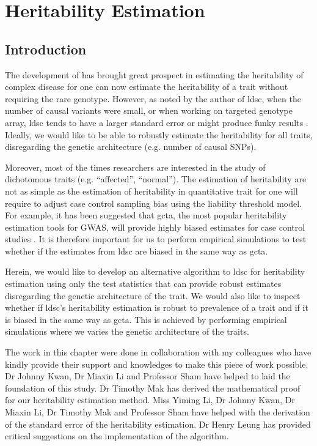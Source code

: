 \chapter{Heritability Estimation}

	\section{Introduction}
	The development of  has brought great prospect in estimating the heritability of complex disease for one can now estimate the heritability of a trait without requiring the rare genotype. 
	However, as noted by the author of \gls{ldsc}, when the number of causal variants were small, or when working on targeted genotype array, \gls{ldsc} tends to have a larger standard error or might produce funky results \citep{Bulik-Sullivan2015}.
	Ideally, we would like to be able to robustly estimate the heritability for all traits, disregarding the genetic architecture (e.g. number of causal \glspl{SNP}).
	
	Moreover, most of the times researchers are interested in the study of dichotomous traits (e.g. ``affected'', ``normal'').
	The estimation of heritability are not as simple as the estimation of heritability in quantitative trait for one will require to adjust case control sampling bias using the liability threshold model.
	For example, it has been suggested that \gls{gcta}, the most popular heritability estimation tools for \gls{GWAS}, will provide highly biased estimates for case control studies \citep{Golan2014}.
	It is therefore important for us to perform empirical simulations to test whether if the estimates from \gls{ldsc} are biased in the same way as \gls{gcta}.
	
	Herein, we would like to develop an alternative algorithm to \gls{ldsc} for heritability estimation using only the test statistics that can provide robust estimates disregarding the genetic architecture of the trait.
	We would also like to inspect whether if \gls{ldsc}'s heritability estimation is robust to prevalence of a trait and if it is biased in the same way as \gls{gcta}.
	This is achieved by performing empirical simulations where we varies the genetic architecture of the traits.
	
	The work in this chapter were done in collaboration with my colleagues who have kindly provide their support and knowledges to make this piece of work possible.
	Dr Johnny Kwan, Dr Miaxin Li and Professor Sham have helped to laid the foundation of this study. 
	Dr Timothy Mak has derived the mathematical proof for our heritability estimation method. 
	Miss Yiming Li, Dr Johnny Kwan, Dr Miaxin Li, Dr Timothy Mak and Professor Sham have helped with the derivation of the standard error of the heritability estimation. 
	Dr Henry Leung has provided critical suggestions on the implementation of the algorithm.
	
